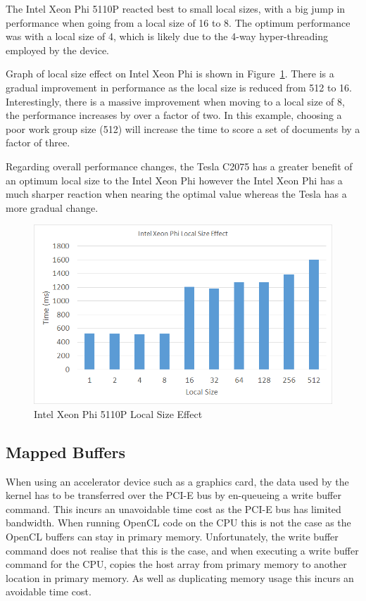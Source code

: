 The Intel Xeon Phi 5110P reacted best to small local sizes, with a big jump in
performance when going from a local size of 16 to 8. The optimum performance was
with a local size of 4, which is likely due to the 4-way hyper-threading
employed by the device.

Graph of local size effect on Intel Xeon Phi is shown in
Figure~\ref{fig:phiLocalSize}. There is a gradual improvement in performance as
the local size is reduced from 512 to 16. Interestingly, there is a massive
improvement when moving to a local size of 8, the performance increases by over
a factor of two. In this example, choosing a poor work group size (512) will
increase the time to score a set of documents by a factor of three.

Regarding overall performance changes, the Tesla C2075 has a greater benefit of
an optimum local size to the Intel Xeon Phi however the Intel Xeon Phi has a
much sharper reaction when nearing the optimal value whereas the Tesla has a
more gradual change.

\begin{figure}[H]
\includegraphics[width=\linewidth]{images/phiLocalSize.png}
\caption{Intel Xeon Phi 5110P Local Size Effect}
\label{fig:phiLocalSize}
\end{figure}

\subsection{Mapped Buffers}

When using an accelerator device such as a graphics card, the data used by the
kernel has to be transferred over the PCI-E bus by en-queueing a write buffer
command. This incurs an unavoidable time cost as the PCI-E bus has limited
bandwidth. When running OpenCL code on the CPU this is not the case as the
OpenCL buffers can stay in primary memory. Unfortunately, the write buffer
command does not realise that this is the case, and when executing a write
buffer command for the CPU, copies the host array from primary memory to another
location in primary memory. As well as duplicating memory usage this incurs an
avoidable time cost.

